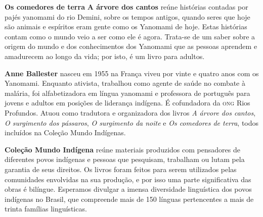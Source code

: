 \textbf{Os comedores de terra} \textbf{A árvore dos cantos} reúne histórias contadas por pajés yanomami do rio Demini, sobre os tempos antigos, quando seres que hoje são animais e espíritos eram gente como os Yanomami de hoje. Estas histórias contam como o mundo veio a ser como ele é agora. Trata-se de um saber sobre a origem do mundo e dos conhecimentos dos Yanomami que as pessoas aprendem e amadurecem ao longo da vida; por isto, é um livro para adultos. 

\textbf{Anne Ballester} nasceu em 1955 na França viveu por vinte e quatro anos com os Yanomami. 
Enquanto ativista, trabalhou como agente de saúde no combate à malária, foi alfabetizadora em língua 
yanomami e professora de português para jovens e adultos em posições de liderança indígena. É cofundadora da \textsc{ong} Rios Profundos. Atuou como tradutora e organizadora dos livros \textit{A árvore dos cantos}, \textit{O surgimento dos pássaros}, \textit{O surgimento da noite} e \textit{Os comedores de terra}, todos incluídos na Coleção Mundo Indígenas.

\textbf{Coleção Mundo Indígena} reúne materiais produzidos com pensadores de diferentes povos indígenas e pessoas que pesquisam, trabalham ou lutam pela garantia de seus direitos. Os livros foram feitos para serem utilizados pelas comunidades envolvidas na sua produção, e por isso uma parte significativa das obras é bilíngue. Esperamos divulgar a imensa diversidade linguística dos povos indígenas no Brasil, que compreende mais de 150 línguas pertencentes a mais de trinta famílias linguísticas.



